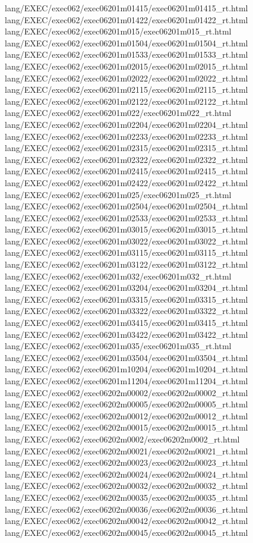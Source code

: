 lang/EXEC/exec062/exec06201m01415/exec06201m01415_rt.html
lang/EXEC/exec062/exec06201m01422/exec06201m01422_rt.html
lang/EXEC/exec062/exec06201m015/exec06201m015_rt.html
lang/EXEC/exec062/exec06201m01504/exec06201m01504_rt.html
lang/EXEC/exec062/exec06201m01533/exec06201m01533_rt.html
lang/EXEC/exec062/exec06201m02015/exec06201m02015_rt.html
lang/EXEC/exec062/exec06201m02022/exec06201m02022_rt.html
lang/EXEC/exec062/exec06201m02115/exec06201m02115_rt.html
lang/EXEC/exec062/exec06201m02122/exec06201m02122_rt.html
lang/EXEC/exec062/exec06201m022/exec06201m022_rt.html
lang/EXEC/exec062/exec06201m02204/exec06201m02204_rt.html
lang/EXEC/exec062/exec06201m02233/exec06201m02233_rt.html
lang/EXEC/exec062/exec06201m02315/exec06201m02315_rt.html
lang/EXEC/exec062/exec06201m02322/exec06201m02322_rt.html
lang/EXEC/exec062/exec06201m02415/exec06201m02415_rt.html
lang/EXEC/exec062/exec06201m02422/exec06201m02422_rt.html
lang/EXEC/exec062/exec06201m025/exec06201m025_rt.html
lang/EXEC/exec062/exec06201m02504/exec06201m02504_rt.html
lang/EXEC/exec062/exec06201m02533/exec06201m02533_rt.html
lang/EXEC/exec062/exec06201m03015/exec06201m03015_rt.html
lang/EXEC/exec062/exec06201m03022/exec06201m03022_rt.html
lang/EXEC/exec062/exec06201m03115/exec06201m03115_rt.html
lang/EXEC/exec062/exec06201m03122/exec06201m03122_rt.html
lang/EXEC/exec062/exec06201m032/exec06201m032_rt.html
lang/EXEC/exec062/exec06201m03204/exec06201m03204_rt.html
lang/EXEC/exec062/exec06201m03315/exec06201m03315_rt.html
lang/EXEC/exec062/exec06201m03322/exec06201m03322_rt.html
lang/EXEC/exec062/exec06201m03415/exec06201m03415_rt.html
lang/EXEC/exec062/exec06201m03422/exec06201m03422_rt.html
lang/EXEC/exec062/exec06201m035/exec06201m035_rt.html
lang/EXEC/exec062/exec06201m03504/exec06201m03504_rt.html
lang/EXEC/exec062/exec06201m10204/exec06201m10204_rt.html
lang/EXEC/exec062/exec06201m11204/exec06201m11204_rt.html
lang/EXEC/exec062/exec06202m00002/exec06202m00002_rt.html
lang/EXEC/exec062/exec06202m00005/exec06202m00005_rt.html
lang/EXEC/exec062/exec06202m00012/exec06202m00012_rt.html
lang/EXEC/exec062/exec06202m00015/exec06202m00015_rt.html
lang/EXEC/exec062/exec06202m0002/exec06202m0002_rt.html
lang/EXEC/exec062/exec06202m00021/exec06202m00021_rt.html
lang/EXEC/exec062/exec06202m00023/exec06202m00023_rt.html
lang/EXEC/exec062/exec06202m00024/exec06202m00024_rt.html
lang/EXEC/exec062/exec06202m00032/exec06202m00032_rt.html
lang/EXEC/exec062/exec06202m00035/exec06202m00035_rt.html
lang/EXEC/exec062/exec06202m00036/exec06202m00036_rt.html
lang/EXEC/exec062/exec06202m00042/exec06202m00042_rt.html
lang/EXEC/exec062/exec06202m00045/exec06202m00045_rt.html
